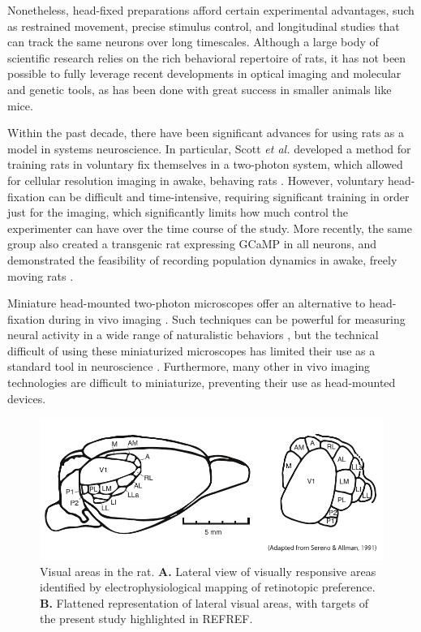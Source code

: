 Nonetheless, head-fixed preparations afford certain experimental advantages, such as restrained movement, precise stimulus control, and longitudinal studies that can track the same neurons over long timescales. Although a large body of scientific research relies on the rich behavioral repertoire of rats, it has not been possible to fully leverage recent developments in optical imaging and molecular and genetic tools, as has been done with great success in smaller animals like mice. 

Within the past decade, there have been significant advances for using rats as a model in systems neuroscience. In particular, Scott \textit{et al.} developed a method for training rats in voluntary fix themselves in a two-photon system, which allowed for cellular resolution imaging in awake, behaving rats \cite{Scott2013}. However, voluntary head-fixation can be difficult and time-intensive, requiring significant training in order just for the imaging, which significantly limits how much control the experimenter can have over the time course of the study. More recently, the same group also created a transgenic rat expressing GCaMP in all neurons, and demonstrated the feasibility of recording population dynamics in awake, freely moving rats \cite{Scott2018ImagingMacroscope}. 

Miniature head-mounted two-photon microscopes offer an alternative to head-fixation during in vivo imaging \cite{Helmchen2001, Piyawattanametha2009, Sawinski2009}. Such techniques can be powerful for measuring neural activity in a wide range of naturalistic behaviors \cite{Sawinski2009}, but the technical difficult of using these miniaturized microscopes has limited their use as a standard tool in neuroscience \cite{Kerr2012}. Furthermore, many other in vivo imaging technologies are difficult to miniaturize, preventing their use as head-mounted devices. 


\begin{figure}[t!]
    \includegraphics[width=\textwidth]{figures/chapter_2/rat_visual_areas.pdf}
    \vspace{.1in}
    \caption[Visual areas in the rat]{Visual areas in the rat. \textbf{A.} Lateral view of visually responsive areas identified by electrophysiological mapping of retinotopic preference. \textbf{B.} Flattened representation of lateral visual areas, with targets of the present study highlighted in REFREF. 
    \label{fig:rat_visual_areas}}
\end{figure}

